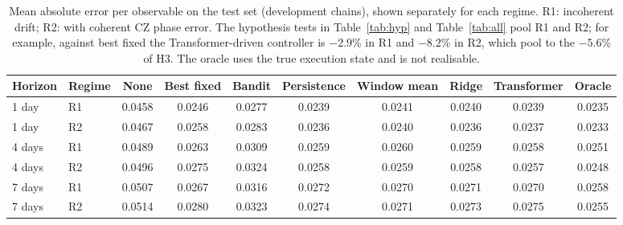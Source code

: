 \documentclass[conference]{IEEEtran}
\begin{document}
\begin{table}[htbp]
\caption{Mean absolute error per observable on the test set (development chains), shown separately for each regime. R1: incoherent drift; R2: with coherent CZ phase error. The hypothesis tests in Table~\ref{tab:hyp} and Table~\ref{tab:all} pool R1 and R2; for example, against best fixed the Transformer-driven controller is $-2.9$\% in R1 and $-8.2$\% in R2, which pool to the $-5.6$\% of H3. The oracle uses the true execution state and is not realisable.}
\begin{center}
\begin{tabular}{llcccccccc}
\toprule
\textbf{Horizon} & \textbf{Regime} & \textbf{None} & \textbf{Best fixed} & \textbf{Bandit} & \textbf{Persistence} & \textbf{Window mean} & \textbf{Ridge} & \textbf{Transformer} & \textbf{Oracle} \\
\midrule
1 day & R1 & 0.0458 & 0.0246 & 0.0277 & 0.0239 & 0.0241 & 0.0240 & 0.0239 & 0.0235 \\
1 day & R2 & 0.0467 & 0.0258 & 0.0283 & 0.0236 & 0.0240 & 0.0236 & 0.0237 & 0.0233 \\
4 days & R1 & 0.0489 & 0.0263 & 0.0309 & 0.0259 & 0.0260 & 0.0259 & 0.0258 & 0.0251 \\
4 days & R2 & 0.0496 & 0.0275 & 0.0324 & 0.0258 & 0.0259 & 0.0258 & 0.0257 & 0.0248 \\
7 days & R1 & 0.0507 & 0.0267 & 0.0316 & 0.0272 & 0.0270 & 0.0271 & 0.0270 & 0.0258 \\
7 days & R2 & 0.0514 & 0.0280 & 0.0323 & 0.0274 & 0.0271 & 0.0273 & 0.0275 & 0.0255 \\
\bottomrule
\end{tabular}
\label{tab:err}
\end{center}
\end{table}
\end{document}

